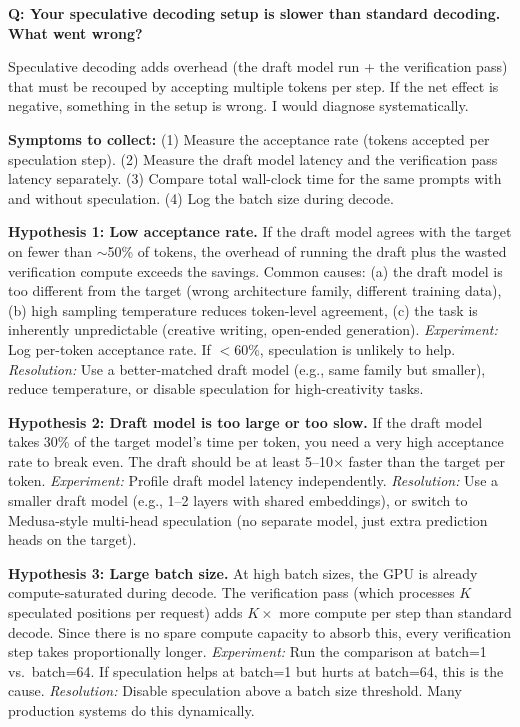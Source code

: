 
\begin{interviewq}
\textbf{Q: Your speculative decoding setup is slower than standard decoding. What went wrong?}

 \quad {} \quad \badgefreq{\freqlow}

\stronganswer

Speculative decoding adds overhead (the draft model run + the verification pass) that must be recouped by accepting multiple tokens per step. If the net effect is negative, something in the setup is wrong. I would diagnose systematically.

\textbf{Symptoms to collect:} (1) Measure the acceptance rate (tokens accepted per speculation step). (2) Measure the draft model latency and the verification pass latency separately. (3) Compare total wall-clock time for the same prompts with and without speculation. (4) Log the batch size during decode.

\textbf{Hypothesis 1: Low acceptance rate.} If the draft model agrees with the target on fewer than $\sim$50\% of tokens, the overhead of running the draft plus the wasted verification compute exceeds the savings. Common causes: (a) the draft model is too different from the target (wrong architecture family, different training data), (b) high sampling temperature reduces token-level agreement, (c) the task is inherently unpredictable (creative writing, open-ended generation). \textit{Experiment:} Log per-token acceptance rate. If $<$60\%, speculation is unlikely to help. \textit{Resolution:} Use a better-matched draft model (e.g., same family but smaller), reduce temperature, or disable speculation for high-creativity tasks.

\textbf{Hypothesis 2: Draft model is too large or too slow.} If the draft model takes 30\% of the target model's time per token, you need a very high acceptance rate to break even. The draft should be at least 5--10$\times$ faster than the target per token. \textit{Experiment:} Profile draft model latency independently. \textit{Resolution:} Use a smaller draft model (e.g., 1--2 layers with shared embeddings), or switch to Medusa-style multi-head speculation (no separate model, just extra prediction heads on the target).

\textbf{Hypothesis 3: Large batch size.} At high batch sizes, the GPU is already compute-saturated during decode. The verification pass (which processes $K$ speculated positions per request) adds $K\times$ more compute per step than standard decode. Since there is no spare compute capacity to absorb this, every verification step takes proportionally longer. \textit{Experiment:} Run the comparison at batch=1 vs.\ batch=64. If speculation helps at batch=1 but hurts at batch=64, this is the cause. \textit{Resolution:} Disable speculation above a batch size threshold. Many production systems do this dynamically.


\end{interviewq}

